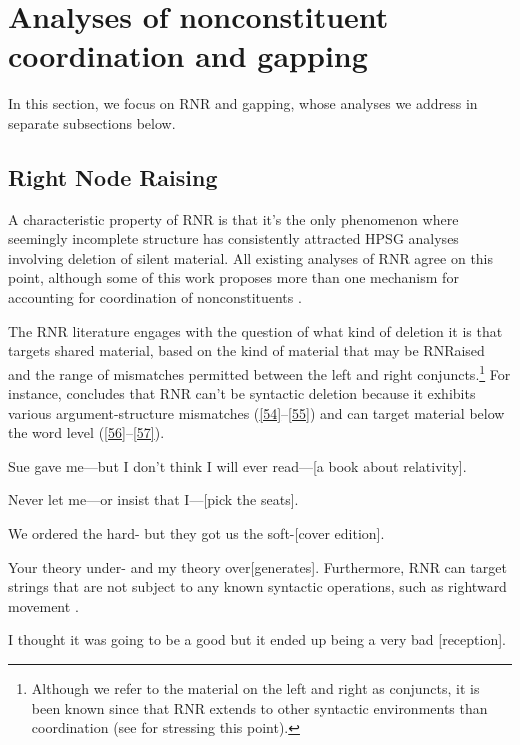 \documentclass[output=paper
                ,modfonts
                ,nonflat
	        ,collection
	        ,collectionchapter
	        ,collectiontoclongg
 	        ,biblatex
                ,babelshorthands
                ,newtxmath
                ,draftmode
                ,colorlinks, citecolor=brown
]{./langsci/langscibook}
\begin{document}
{\section{Analyses of nonconstituent coordination and gapping}
In this section, we focus on RNR and gapping, whose analyses we address in separate subsections below.

\subsection{Right Node Raising}
A characteristic property of RNR is that it's the only phenomenon where seemingly incomplete structure has consistently attracted HPSG analyses involving deletion of silent material. All existing analyses of RNR \citep{Abeille2016, Beavers2004, Chaves2008-in-lexicon, Chavez2014, Crysmann2003, Yatabe2001, Yatabe2012} agree on this point, although some of this work proposes more than one mechanism for accounting for coordination of nonconstituents \citep{Chaves2014, Yatabe2001, Yatabe2012, Yatabe2018}.

The RNR literature engages with the question of what kind of deletion it is that targets shared material, based on the kind of material that may be RNRaised and the range of mismatches permitted between the left and right conjuncts.\footnote{Although we refer to the material on the left and right as conjuncts, it is been known since \citet{Hudson1976, Hudson1984} that RNR extends to other syntactic environments than coordination (see \citealt{Chaves2014} for stressing this point).} For instance, \citet[839--840]{Chaves2014} concludes that RNR can't be syntactic deletion because it exhibits various argument-structure mismatches (\ref{54}--\ref{55}) and can target material below the word level (\ref{56}--\ref{57}).


\ea Sue gave me---but I don't think I will ever read---[a book about relativity]. \label{54}\z

\ea Never let me---or insist that I---[pick the seats].\label{55}\z

\ea We ordered the hard- but they got us the soft-[cover edition].\label{56}\z

\ea Your theory under- and my theory over[generates].\label{57}\z
Furthermore, RNR can target strings that are not subject to any known syntactic operations, such as rightward movement \citep[865]{Chaves2014}.

\ea I thought it was going to be a good but it ended up being a very bad [reception].\label{58}\z

}
\end{document}
